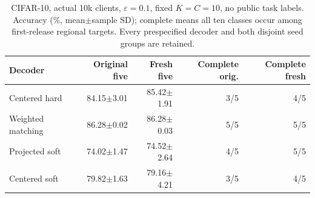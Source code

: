 \begin{table}[t]
\caption{CIFAR-10, actual 10k clients, $\varepsilon=0.1$, fixed $K=C=10$, no public task labels. Accuracy (\%, mean$\pm$sample SD); complete means all ten classes occur among first-release regional targets. Every prespecified decoder and both disjoint seed groups are retained.}
\label{tab:decoder-cifar}\small
\centering
\begin{tabular}{@{}lrrrr@{}}\toprule
Decoder & Original five & Fresh five & Complete orig. & Complete fresh \\
\midrule
Centered hard & 84.15$\pm$3.01 & 85.42$\pm$1.91 & 3/5 & 4/5 \\
Weighted matching & 86.28$\pm$0.02 & 86.28$\pm$0.03 & 5/5 & 5/5 \\
Projected soft & 74.02$\pm$1.47 & 74.52$\pm$2.64 & 4/5 & 5/5 \\
Centered soft & 79.82$\pm$1.63 & 79.16$\pm$4.21 & 3/5 & 4/5 \\
\bottomrule\end{tabular}
\end{table}

